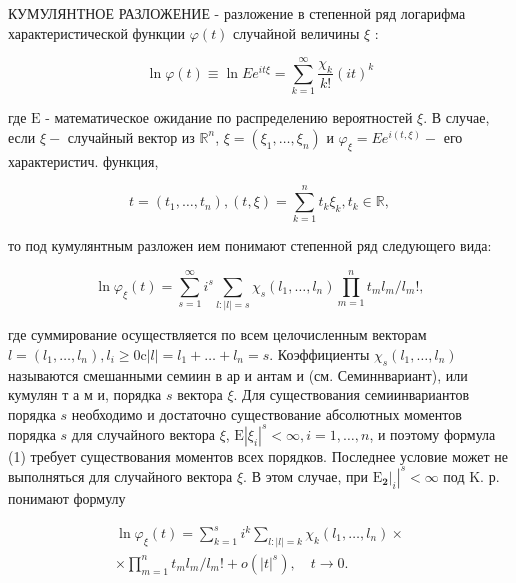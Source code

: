 \documentclass[10pt]{article}
\begin{document}
КУМУЛЯНТНОЕ РАЗЛОЖЕНИЕ - разложение в степенной ряд логарифма характеристической функции $\varphi(t)$ случайной величины $\xi$ :



\[

\ln \varphi(t) \equiv \ln E e^{i t \xi}=\sum_{k=1}^{\infty} \frac{\chi_{k}}{k !}(i t)^{k}

\]



где $\mathrm{E}$ - математическое ожидание по распределению вероятностей $\xi$. В случае, если $\xi-$ случайный вектор из $\mathbb{R}^{n}$, $\xi=\left(\xi_{1}, \ldots, \xi_{n}\right)$ и $\varphi_{\xi}=E e^{i(t, \xi)}-$ его характеристич. функция,



\[

t=\left(t_{1}, \ldots, t_{n}\right),(t, \xi)=\sum_{k=1}^{n} t_{k} \xi_{k}, t_{k} \in \mathbb{R},

\]



то под кумулянтным разложен ием понимают степенной ряд следующего вида:



\[

\ln \varphi_{\xi}(t)=\sum_{s=1}^{\infty} i^{s} \sum_{l:|l|=s} \chi_{s}\left(l_{1}, \ldots, l_{n}\right) \prod_{m=1}^{n} t_{m} l_{m} / l_{m} !,

\]



где суммирование осуществляется по всем целочисленным векторам $l=\left(l_{1}, \ldots, l_{n}\right), l_{i} \geqslant 0 \mathrm{c}|l|=l_{1}+\ldots+l_{n}=s$. Коэффициенты $\chi_{s}\left(l_{1}, \ldots, l_{n}\right)$ называются смешанными семиин в ар и антам и (см. Семиннвариант), или кумулян т а м и, порядка $s$ вектора $\xi$. Для существования семиинвариантов порядка $s$ необходимо и достаточно существование абсолютных моментов порядка $s$ для случайного вектора $\xi$, $\mathrm{E}\left|\xi_{i}\right|^{s}<\infty, i=1, \ldots, n$, и поэтому формула (1) требует существования моментов всех порядков. Последнее условие может не выполняться для случайного вектора $\xi$. В этом случае, при $\left.\left.\mathrm{E}_{\boldsymbol{2}}\right|_{i}\right|^{s}<\infty$ под K. р. понимают формулу



\[

\begin{gathered}

\ln \varphi_{\xi}(t)=\sum_{k=1}^{s} i^{k} \sum_{l:|l|=k} \chi_{k}\left(l_{1}, \ldots, l_{n}\right) \times \\

\times \prod_{m=1}^{n} t_{m} l_{m} / l_{m} !+o\left(|t|^{s}\right), \quad t \rightarrow 0 .

\end{gathered}

\]
\end{document}
